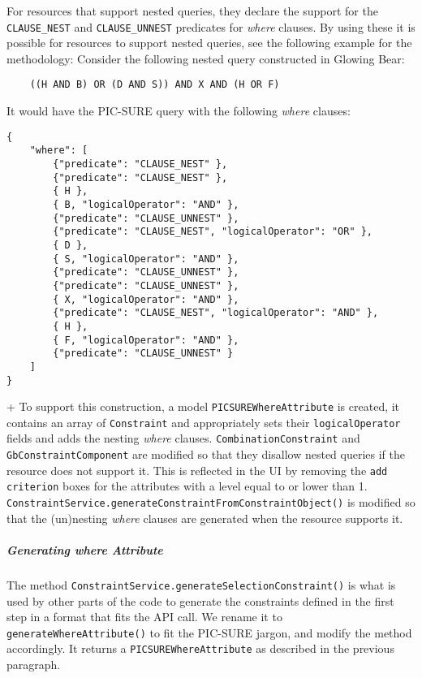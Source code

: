 For resources that support nested queries, they declare the support for the \verb|CLAUSE_NEST| and \verb|CLAUSE_UNNEST| predicates for \emph{where} clauses.
By using these it is possible for resources to support nested queries, see the following example for the methodology:
Consider the following nested query constructed in Glowing Bear:
\begin{verbatim}
    ((H AND B) OR (D AND S)) AND X AND (H OR F)
\end{verbatim}
It would have the PIC-SURE query with the following \emph{where} clauses:
\begin{verbatim}
{
    "where": [
        {"predicate": "CLAUSE_NEST" },
        {"predicate": "CLAUSE_NEST" },
        { H },
        { B, "logicalOperator": "AND" },
        {"predicate": "CLAUSE_UNNEST" },
        {"predicate": "CLAUSE_NEST", "logicalOperator": "OR" },
        { D },
        { S, "logicalOperator": "AND" },
        {"predicate": "CLAUSE_UNNEST" },
        {"predicate": "CLAUSE_UNNEST" },
        { X, "logicalOperator": "AND" },
        {"predicate": "CLAUSE_NEST", "logicalOperator": "AND" },
        { H },
        { F, "logicalOperator": "AND" },
        {"predicate": "CLAUSE_UNNEST" }
    ]
}
\end{verbatim}
+
To support this construction, a model \verb|PICSUREWhereAttribute| is created, it contains an array of \verb|Constraint| and appropriately sets their \verb|logicalOperator| fields and adds the nesting \emph{where} clauses.
\verb|CombinationConstraint| and \verb|GbConstraintComponent| are modified so that they disallow nested queries if the resource does not support it.
This is reflected in the UI by removing the \verb|add criterion| boxes for the attributes with a level equal to or lower than 1.
\verb|ConstraintService.generateConstraintFromConstraintObject()| is modified so that the (un)nesting \emph{where} clauses are generated when the resource supports it.




\subparagraph{Generating \emph{where} Attribute}
The method \verb|ConstraintService.generateSelectionConstraint()| is what is used by other parts of the code to generate the constraints defined in the first step in a format that fits the API call.
We rename it to \verb|generateWhereAttribute()| to fit the PIC-SURE jargon, and modify the method accordingly.
It returns a \verb|PICSUREWhereAttribute| as described in the previous paragraph.

